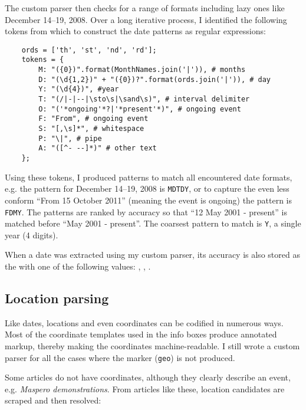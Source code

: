 The custom parser then checks for a range of formats including lazy ones like December 14--19, 2008.
Over a long iterative process, I identified the following tokens from which to construct the date patterns as regular expressions:

\begin{lstlisting}
	ords = ['th', 'st', 'nd', 'rd'];
	tokens = {
		M: "({0})".format(MonthNames.join('|')), # months
		D: "(\d{1,2})" + "({0})?".format(ords.join('|')), # day
		Y: "(\d{4})", #year
		T: "(/|-|--|\sto\s|\sand\s)", # interval delimiter
		O: "('*ongoing'*?|'*present'*)", # ongoing event
		F: "From", # ongoing event
		S: "[,\s]*", # whitespace
		P: "\|", # pipe
		A: "([^- --]*)" # other text
	};
\end{lstlisting}

Using these tokens, I produced patterns to match all encountered date formats, e.g. the pattern for December 14--19, 2008 is \verb"MDTDY", or to capture the even less conform ``From 15 October 2011'' (meaning the event is ongoing) the pattern is \verb"FDMY".
The patterns are ranked by accuracy so that ``12 May 2001 - present'' is matched before ``May 2001 - present''.
The coarsest pattern to match is \verb"Y", a single year (4 digits).

When a date was extracted using my custom parser, its accuracy is also stored as the  with one of the following values: , , .

\subsection{Location parsing}

Like dates, locations and even coordinates can be codified in numerous ways. 
Most of the coordinate templates used in the info boxes produce annotated markup, thereby making the coordinates machine-readable.
I still wrote a custom parser for all the cases where the marker (\verb"geo") is not produced.

Some articles do not have coordinates, although they clearly describe an event, e.g. \emph{Maspero demonstrations}.
From articles like these, location candidates are scraped and then resolved:

